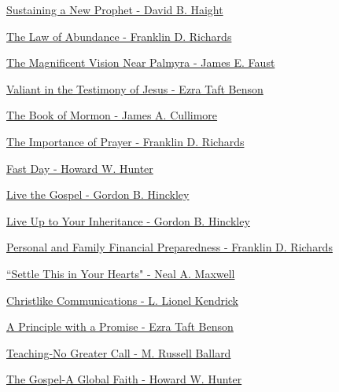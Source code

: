 \href{https://www.lds.org/general-conference/1995/04/sustaining-a-new-prophet?lang=eng}{Sustaining a New Prophet - David B. Haight}

\href{https://www.lds.org/general-conference/1971/04/the-law-of-abundance?lang=eng}{The Law of Abundance - Franklin D. Richards}

\href{https://www.lds.org/general-conference/1984/04/the-magnificent-vision-near-palmyra?lang=eng}{The Magnificent Vision Near Palmyra - James E. Faust}

\href{https://www.lds.org/general-conference/1982/04/valiant-in-the-testimony-of-jesus?lang=eng}{Valiant in the Testimony of Jesus - Ezra Taft Benson}

\href{https://www.lds.org/general-conference/1976/04/the-book-of-mormon?lang=eng}{The Book of Mormon - James A. Cullimore}

\href{https://www.lds.org/general-conference/1972/04/the-importance-of-prayer?lang=eng}{The Importance of Prayer - Franklin D. Richards}

\href{https://www.lds.org/general-conference/1985/10/fast-day?lang=eng}{Fast Day - Howard W. Hunter}

\href{https://www.lds.org/general-conference/1984/10/live-the-gospel?lang=eng}{Live the Gospel - Gordon B. Hinckley}

\href{https://www.lds.org/general-conference/1983/10/live-up-to-your-inheritance?lang=eng}{Live Up to Your Inheritance - Gordon B. Hinckley}

\href{https://www.lds.org/general-conference/1979/04/personal-and-family-financial-preparedness?lang=eng}{Personal and Family Financial Preparedness - Franklin D. Richards}

\href{https://www.lds.org/general-conference/1992/10/settle-this-in-your-hearts?lang=eng}{``Settle This in Your Hearts" - Neal A. Maxwell}

\href{https://www.lds.org/general-conference/1988/10/christlike-communications?lang=eng}{Christlike Communications - L. Lionel Kendrick}

\href{https://www.lds.org/general-conference/1983/04/a-principle-with-a-promise?lang=eng}{A Principle with a Promise - Ezra Taft Benson}

\href{https://www.lds.org/general-conference/1983/04/teaching-no-greater-call?lang=eng}{Teaching-No Greater Call - M. Russell Ballard}

\href{https://www.lds.org/general-conference/1991/10/the-gospel-a-global-faith?lang=eng}{The Gospel-A Global Faith - Howard W. Hunter}

